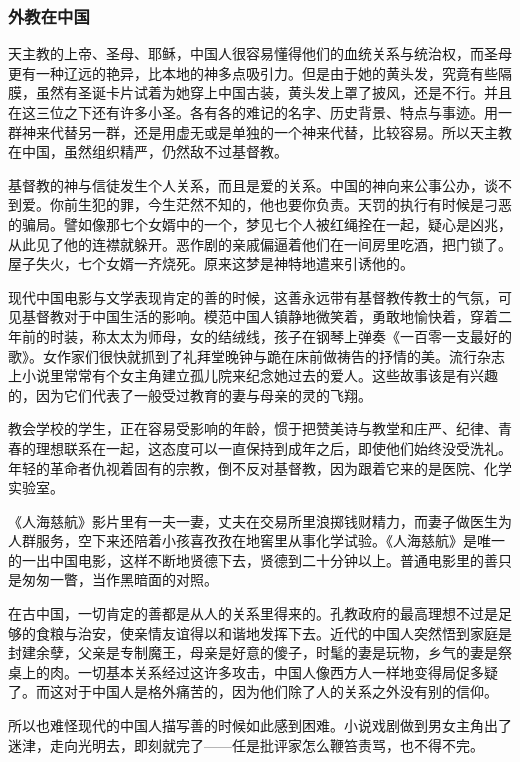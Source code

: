 \subsubsection*{外教在中国}
\par 天主教的上帝、圣母、耶稣，中国人很容易懂得他们的血统关系与统治权，而圣母更有一种辽远的艳异，比本地的神多点吸引力。但是由于她的黄头发，究竟有些隔膜，虽然有圣诞卡片试着为她穿上中国古装，黄头发上罩了披风，还是不行。并且在这三位之下还有许多小圣。各有各的难记的名字、历史背景、特点与事迹。用一群神来代替另一群，还是用虚无或是单独的一个神来代替，比较容易。所以天主教在中国，虽然组织精严，仍然敌不过基督教。
\par 基督教的神与信徒发生个人关系，而且是爱的关系。中国的神向来公事公办，谈不到爱。你前生犯的罪，今生茫然不知的，他也要你负责。天罚的执行有时候是刁恶的骗局。譬如像那七个女婿中的一个，梦见七个人被红绳拴在一起，疑心是凶兆，从此见了他的连襟就躲开。恶作剧的亲戚偏逼着他们在一间房里吃酒，把门锁了。屋子失火，七个女婿一齐烧死。原来这梦是神特地遣来引诱他的。
\par 现代中国电影与文学表现肯定的善的时候，这善永远带有基督教传教士的气氛，可见基督教对于中国生活的影响。模范中国人镇静地微笑着，勇敢地愉快着，穿着二年前的时装，称太太为师母，女的结绒线，孩子在钢琴上弹奏《一百零一支最好的歌》。女作家们很快就抓到了礼拜堂晚钟与跪在床前做祷告的抒情的美。流行杂志上小说里常常有个女主角建立孤儿院来纪念她过去的爱人。这些故事该是有兴趣的，因为它们代表了一般受过教育的妻与母亲的灵的飞翔。
\par 教会学校的学生，正在容易受影响的年龄，惯于把赞美诗与教堂和庄严、纪律、青春的理想联系在一起，这态度可以一直保持到成年之后，即使他们始终没受洗礼。年轻的革命者仇视着固有的宗教，倒不反对基督教，因为跟着它来的是医院、化学实验室。
\par 《人海慈航》影片里有一夫一妻，丈夫在交易所里浪掷钱财精力，而妻子做医生为人群服务，空下来还陪着小孩喜孜孜在地窖里从事化学试验。《人海慈航》是唯一的一出中国电影，这样不断地贤德下去，贤德到二十分钟以上。普通电影里的善只是匆匆一瞥，当作黑暗面的对照。
\par 在古中国，一切肯定的善都是从人的关系里得来的。孔教政府的最高理想不过是足够的食粮与治安，使亲情友谊得以和谐地发挥下去。近代的中国人突然悟到家庭是封建余孽，父亲是专制魔王，母亲是好意的傻子，时髦的妻是玩物，乡气的妻是祭桌上的肉。一切基本关系经过这许多攻击，中国人像西方人一样地变得局促多疑了。而这对于中国人是格外痛苦的，因为他们除了人的关系之外没有别的信仰。
\par 所以也难怪现代的中国人描写善的时候如此感到困难。小说戏剧做到男女主角出了迷津，走向光明去，即刻就完了——任是批评家怎么鞭笞责骂，也不得不完。
